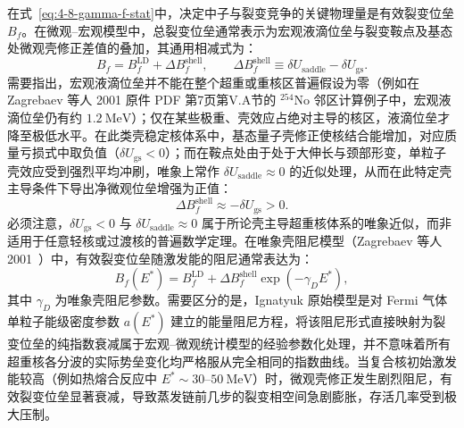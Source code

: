 在式~\eqref{eq:4-8-gamma-f-stat}中，决定中子与裂变竞争的关键物理量是有效裂变位垒 $B_f$。在微观--宏观模型中，总裂变位垒通常表示为宏观液滴位垒与裂变鞍点及基态处微观壳修正差值的叠加，其通用相减式为：
\begin{equation}\label{eq:4-8-shell-barrier-contrib}
B_f = B_f^{\mathrm{LD}} + \Delta B_f^{\mathrm{shell}}, \qquad \Delta B_f^{\mathrm{shell}} \equiv \delta U_{\mathrm{saddle}} - \delta U_{\mathrm{gs}}.
\end{equation}
需要指出，宏观液滴位垒并不能在整个超重或重核区普遍假设为零（例如在 Zagrebaev 等人 2001 原件 PDF 第7页第V.A节的 $^{254}\mathrm{No}$ 邻区计算例子中，宏观液滴位垒仍有约 $1.2\ \mathrm{MeV}$）；仅在某些极重、壳效应占绝对主导的核区，液滴位垒才降至极低水平。在此类壳稳定核体系中，基态量子壳修正使核结合能增加，对应质量亏损式中取负值（$\delta U_{\mathrm{gs}} < 0$）；而在鞍点处由于处于大伸长与颈部形变，单粒子壳效应受到强烈平均冲刷，唯象上常作 $\delta U_{\mathrm{saddle}} \approx 0$ 的近似处理，从而在此特定壳主导条件下导出净微观位垒增强为正值：
\begin{equation}\label{eq:4-8-shell-approx-positive}
\Delta B_f^{\mathrm{shell}} \approx -\delta U_{\mathrm{gs}} > 0.
\end{equation}
必须注意，$\delta U_{\mathrm{gs}} < 0$ 与 $\delta U_{\mathrm{saddle}} \approx 0$ 属于所论壳主导超重核体系的唯象近似，而非适用于任意轻核或过渡核的普遍数学定理。在唯象壳阻尼模型（Zagrebaev 等人 2001~\cite{zagrebaev-2001-superheavy-synthesis-survival}）中，有效裂变位垒随激发能的阻尼通常表达为：
\begin{equation}\label{eq:4-8-bf-shell-decomp}
B_f(E^*) = B_f^{\mathrm{LD}} + \Delta B_f^{\mathrm{shell}} \exp\left(-\gamma_D E^*\right),
\end{equation}
其中 $\gamma_D$ 为唯象壳阻尼参数。需要区分的是，Ignatyuk 原始模型是对 Fermi 气体单粒子能级密度参数 $a(E^*)$ 建立的能量阻尼方程，将该阻尼形式直接映射为裂变位垒的纯指数衰减属于宏观--微观统计模型的经验参数化处理，并不意味着所有超重核各分波的实际势垒变化均严格服从完全相同的指数曲线。当复合核初始激发能较高（例如热熔合反应中 $E^* \sim 30$--$50\ \mathrm{MeV}$）时，微观壳修正发生剧烈阻尼，有效裂变位垒显著衰减，导致蒸发链前几步的裂变相空间急剧膨胀，存活几率受到极大压制。

